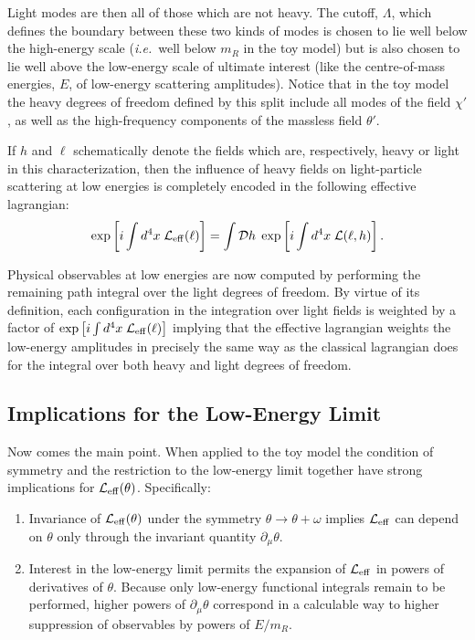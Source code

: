 \documentclass[12pt]{article}
\def\sst{\scriptscriptstyle}
\def\ie{{\it i.e.}}
\begin{document}
 Light modes are then all of
those which are not heavy. The cutoff, $\Lambda$,
which defines the boundary between these two kinds
of modes is chosen to lie well below the high-energy
scale (\ie\ well below $m_{\sst R}$ in the toy model)
but is also chosen to lie well above the low-energy scale
of ultimate interest (like the centre-of-mass energies, 
$E$, of low-energy scattering amplitudes). Notice that
in the toy model the heavy degrees of freedom defined
by this split include all modes of the field $\chi'$, as well 
as the high-frequency components of the massless field $\theta'$.

If $h$ and $\ell$ schematically denote the fields which are,
respectively, heavy
or light in this characterization, then the influence of heavy
fields on light-particle scattering at low energies is completely
encoded in the following effective lagrangian:
%
\begin{equation}
\label{leffdef}
\exp\left[i \int d^4x \; {\cal L}_{\rm eff}(\ell) \right]
= \int {\cal D}h \; \exp\left[ i \int d^4x \;
{\cal L}(\ell,h) \right]. 
\end{equation}

Physical observables at low energies are now computed 
by performing the remaining path integral over the light
degrees of freedom. By virtue of its definition, each
configuration in the integration over light fields is weighted by a 
factor of $\exp\left[i \int d^4x \; {\cal L}_{\rm eff}(\ell) \right]$
implying that the effective lagrangian weights the low-energy
amplitudes in precisely the same way as the classical lagrangian
does for the integral over both heavy and light degrees of freedom.

\subsection{Implications for the Low-Energy Limit}

Now comes the main point. When applied to the toy model
the condition of symmetry and the restriction to the low-energy
limit together have strong implications for ${\cal L}_{\rm eff}(\theta)$.
Specifically:

\begin{enumerate}
\item
Invariance of ${\cal L}_{\rm eff}(\theta)$ under the symmetry 
$\theta \to \theta + \omega$ implies ${\cal L}_{\rm eff}$ can
depend on $\theta$ only through the invariant quantity 
$\partial_\mu \theta$.
%
\item
Interest in the low-energy limit permits the expansion of 
${\cal L}_{\rm eff}$ in powers of derivatives of $\theta$.
Because only low-energy functional integrals remain
to be performed, higher powers of $\partial_\mu\theta$
correspond in a calculable way to higher suppression
of observables by powers of $E/m_{\sst R}$.
%
\end{enumerate}
\end{document}
